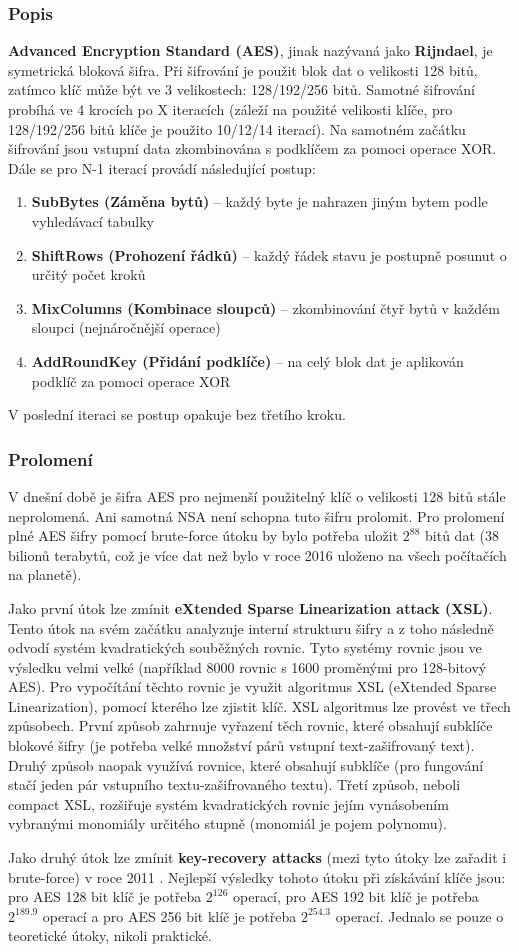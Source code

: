 \documentclass[12pt, a4paper]{article}
\begin{document}
		\subsubsection{Popis}
		\textbf{Advanced Encryption Standard (AES)}, jinak nazývaná jako \textbf{Rijndael}, je symetrická bloková šifra. Při šifrování je použit blok dat o velikosti 128 bitů, zatímco klíč může být ve 3 velikostech: 128/192/256 bitů. Samotné šifrování probíhá ve 4 krocích po X iteracích (záleží na použité velikosti klíče, pro 128/192/256 bitů klíče je použito 10/12/14 iterací). Na samotném začátku šifrování jsou vstupní data zkombinována s podklíčem za pomoci operace XOR. Dále se pro N-1 iterací provádí následující postup:
	\begin{enumerate}
	\item \textbf{SubBytes (Záměna bytů)} -- každý byte je nahrazen jiným bytem podle vyhledávací tabulky
	\item \textbf{ShiftRows (Prohození řádků)} -- každý řádek stavu je postupně posunut o určitý počet kroků
	\item \textbf{MixColumns (Kombinace sloupců)} -- zkombinování čtyř bytů v každém sloupci (nejnáročnější operace)
	\item \textbf{AddRoundKey (Přidání podklíče)} -- na celý blok dat je aplikován podklíč za pomoci operace XOR
	\end{enumerate}
	V poslední iteraci se postup opakuje bez třetího kroku.
		\subsubsection{Prolomení}
		V dnešní době je šifra AES pro nejmenší použitelný klíč o velikosti 128 bitů stále neprolomená. Ani samotná NSA není schopna tuto šifru prolomit. Pro prolomení plné AES šifry pomocí brute-force útoku by bylo potřeba uložit $2^{88}$ bitů dat (38 bilionů terabytů, což je více dat než bylo v roce 2016 uloženo na všech počítačích na planetě).
		\par Jako první útok lze zmínit \textbf{eXtended Sparse Linearization attack (XSL)}. Tento útok na svém začátku analyzuje interní strukturu šifry a z toho následně odvodí systém kvadratických souběžných rovnic. Tyto systémy rovnic jsou ve výsledku velmi velké (například 8000 rovnic s 1600 proměnými pro 128-bitový AES). Pro vypočítání těchto rovnic je využit algoritmus XSL (eXtended Sparse Linearization), pomocí kterého lze zjistit klíč. XSL algoritmus lze provést ve třech způsobech. První způsob zahrnuje vyřazení těch rovnic, které obsahují subklíče blokové šifry (je potřeba velké množství párů vstupní text-zašifrovaný text). Druhý způsob naopak využívá rovnice, které obsahují subklíče (pro fungování stačí jeden pár vstupního textu-zašifrovaného textu). Třetí způsob, neboli compact XSL, rozšiřuje systém kvadratických rovnic jejím vynásobením vybranými monomiály určitého stupně (monomiál je pojem polynomu).
		\par Jako druhý útok lze zmínit \textbf{key-recovery attacks} (mezi tyto útoky lze zařadit i brute-force) v roce 2011 . Nejlepší výsledky tohoto útoku při získávání klíče jsou: pro AES 128 bit klíč je potřeba $2^{126}$ operací, pro AES 192 bit klíč je potřeba $2^{189.9}$ operací a pro AES 256 bit klíč je potřeba $2^{254.3}$  operací. Jednalo se pouze o teoretické útoky, nikoli praktické.
\end{document}
